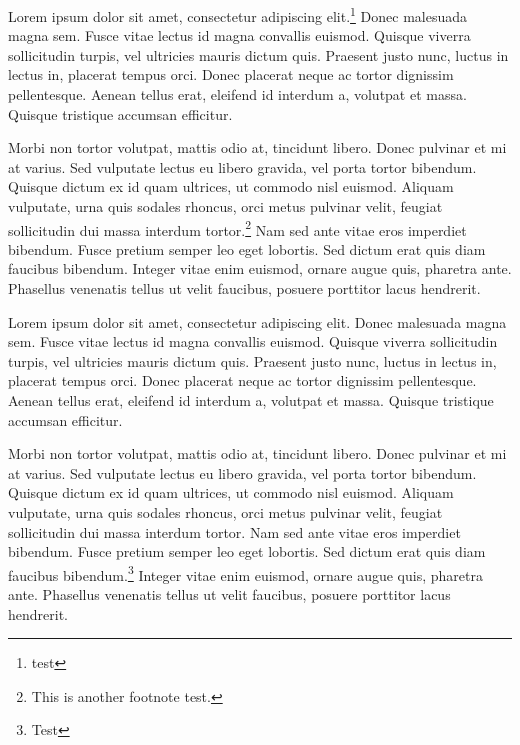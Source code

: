 Lorem ipsum dolor sit amet, consectetur adipiscing elit.\cite{feynman,statistics}\footnote{test}
Donec malesuada magna sem.
Fusce vitae lectus id magna convallis euismod.
Quisque viverra sollicitudin turpis, vel ultricies mauris dictum quis.
Praesent justo nunc, luctus in lectus in, placerat tempus orci.
Donec placerat neque ac tortor dignissim pellentesque.
Aenean tellus erat, eleifend id interdum a, volutpat et massa.
Quisque tristique accumsan efficitur.

Morbi non tortor volutpat, mattis odio at, tincidunt libero.
Donec pulvinar et mi at varius.
Sed vulputate lectus eu libero gravida, vel porta tortor bibendum.
Quisque dictum ex id quam ultrices, ut commodo nisl euismod.
Aliquam vulputate, urna quis sodales rhoncus, orci metus pulvinar velit, feugiat sollicitudin dui massa interdum tortor.\footnote{This is another footnote test.} %
Nam sed ante vitae eros imperdiet bibendum. 
Fusce pretium semper leo eget lobortis.
Sed dictum erat quis diam faucibus bibendum.
Integer vitae enim euismod, ornare augue quis, pharetra ante.
Phasellus venenatis tellus ut velit faucibus, posuere porttitor lacus hendrerit.

Lorem ipsum dolor sit amet, consectetur adipiscing elit.
Donec malesuada magna sem.
Fusce vitae lectus id magna convallis euismod.
Quisque viverra sollicitudin turpis, vel ultricies mauris dictum quis.
Praesent justo nunc, luctus in lectus in, placerat tempus orci.
Donec placerat neque ac tortor dignissim pellentesque.
Aenean tellus erat, eleifend id interdum a, volutpat et massa.
Quisque tristique accumsan efficitur.

Morbi non tortor volutpat, mattis odio at, tincidunt libero.
Donec pulvinar et mi at varius.
Sed vulputate lectus eu libero gravida, vel porta tortor bibendum.
Quisque dictum ex id quam ultrices, ut commodo nisl euismod.
Aliquam vulputate, urna quis sodales rhoncus, orci metus pulvinar velit, feugiat sollicitudin dui massa interdum tortor.
Nam sed ante vitae eros imperdiet bibendum.
Fusce pretium semper leo eget lobortis.
Sed dictum erat quis diam faucibus bibendum.\footnote{Test}\cite{particle}
Integer vitae enim euismod, ornare augue quis, pharetra ante.
Phasellus venenatis tellus ut velit faucibus, posuere porttitor lacus hendrerit.


